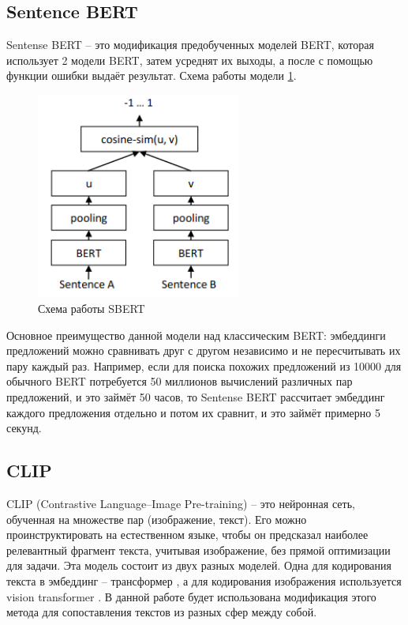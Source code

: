 \documentclass[PI, VKR]{HSEUniversity}
\begin{document}
\subsection{Sentence BERT}
\label{sec:org92d857d}
Sentense BERT \autocite{reimers-2019-sentence-bert} -- это модификация предобученных моделей BERT, которая использует 2 модели BERT, затем усреднят их выходы, а после с помощью функции ошибки выдаёт результат. Схема работы модели \ref{fig:sbert}.
\begin{figure}[hbp]
\centering
\includegraphics[width=0.6\textwidth]{img/sbert.png}
\caption{\label{fig:sbert}Схема работы SBERT}
\end{figure}
Основное преимущество данной модели над классическим BERT: эмбеддинги предложений можно сравнивать друг с другом независимо и не пересчитывать их пару каждый раз. Например, если для поиска похожих предложений из 10000 для обычного BERT потребуется 50 миллионов вычислений различных пар предложений, и это займёт 50 часов, то Sentense BERT рассчитает эмбеддинг каждого предложения отдельно и потом их сравнит, и это займёт примерно 5 секунд.
\subsection{CLIP}
\label{sec:org0e1083c}
CLIP (Contrastive Language–Image Pre-training)\autocite{radford2021learning} -- это нейронная сеть, обученная на множестве пар (изображение, текст). Его можно проинструктировать на естественном языке, чтобы он предсказал наиболее релевантный фрагмент текста, учитывая изображение, без прямой оптимизации для задачи. Эта модель состоит из двух разных моделей. Одна для кодирования текста в эмбеддинг -- трансформер \autocite{NIPS2017_3f5ee243}, а для кодирования изображения используется vision transformer \autocite{dosovitskiy2020image}. В данной работе будет использована модификация этого метода для сопоставления текстов из разных сфер между собой.
\end{document}

